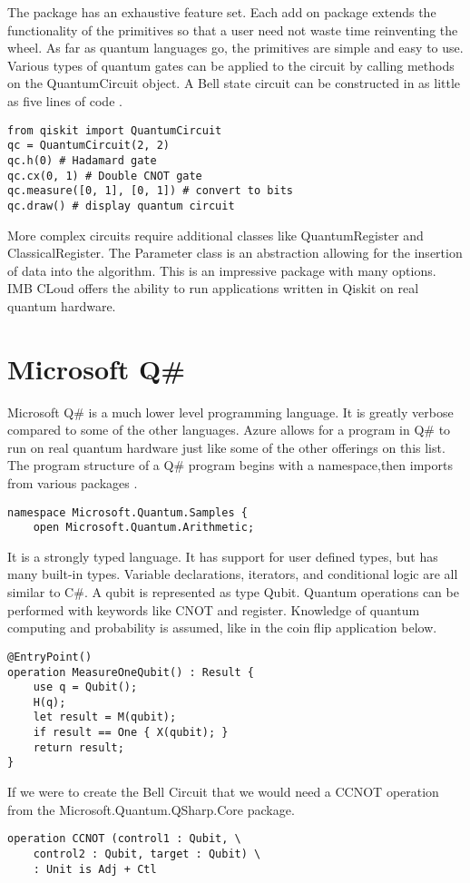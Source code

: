 \documentclass[conference]{IEEEtran}
\begin{document}
The package has an exhaustive feature set. 
Each add on package extends the functionality of the primitives so that a user need not waste time reinventing the wheel. 
As far as quantum languages go, the primitives are simple and easy to use. 
Various types of quantum gates can be applied to the circuit by calling methods on the QuantumCircuit object. 
A Bell state circuit can be constructed in as little as five lines of code \cite{b7}. 

\begin{verbatim}
from qiskit import QuantumCircuit
qc = QuantumCircuit(2, 2)
qc.h(0) # Hadamard gate
qc.cx(0, 1) # Double CNOT gate
qc.measure([0, 1], [0, 1]) # convert to bits
qc.draw() # display quantum circuit
\end{verbatim}

More complex circuits require additional classes like QuantumRegister and ClassicalRegister. 
The Parameter class is an abstraction allowing for the insertion of data into the algorithm. 
This is an impressive package with many options. 
IMB CLoud offers the ability to run applications written in Qiskit on real quantum hardware.



\section{Microsoft Q\#}
Microsoft Q\# is a much lower level programming language. 
It is greatly verbose compared to some of the other languages. 
Azure allows for a program in Q\# to run on real quantum hardware just like some of the other offerings on this list. 
The program structure of a Q\# program begins with a namespace,then imports from various packages \cite{b6}. 
\begin{verbatim}
namespace Microsoft.Quantum.Samples {
    open Microsoft.Quantum.Arithmetic; 
\end{verbatim}
It is a strongly typed language. 
It has support for user defined types, but has many built-in types. 
Variable declarations, iterators, and conditional logic are all similar to C\#. 
A qubit is represented as type Qubit. 
Quantum operations can be performed with keywords like CNOT and register. 
Knowledge of quantum computing and probability is assumed, like in the coin flip application below. 
\begin{verbatim}
@EntryPoint()
operation MeasureOneQubit() : Result {
    use q = Qubit();  
    H(q);      
    let result = M(qubit);
    if result == One { X(qubit); }
    return result;
}
\end{verbatim}
If we were to create the Bell Circuit that we would need a CCNOT operation from the Microsoft.Quantum.QSharp.Core package. 
\begin{verbatim}
operation CCNOT (control1 : Qubit, \
    control2 : Qubit, target : Qubit) \
    : Unit is Adj + Ctl
\end{verbatim}
\end{document}
